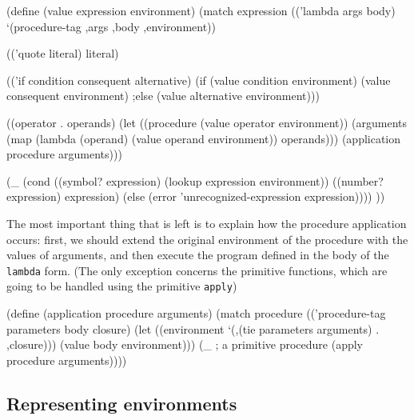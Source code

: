 \begin{Snippet}
(define (value expression environment)
  (match expression
    (('lambda args body)
     `(procedure-tag ,args ,body ,environment))
\end{Snippet}
\begin{Snippet}    
    (('quote literal)
     literal)
\end{Snippet}
\begin{Snippet}        
    (('if condition consequent alternative)
     (if (value condition environment)
         (value consequent environment)
     ;else
         (value alternative environment)))
\end{Snippet}
\begin{Snippet}    
    ((operator . operands)
     (let ((procedure (value operator environment))
           (arguments (map (lambda (operand)
                              (value operand environment))
			   operands)))
         (application procedure arguments)))
\end{Snippet}
\begin{Snippet}    
    (_
     (cond ((symbol? expression)
            (lookup expression environment))
           ((number? expression)
            expression)
           (else
            (error 'unrecognized-expression expression))))
    ))
\end{Snippet}

The most important thing that is left is to explain how
the procedure application occurs: first, we should extend
the original environment of the procedure with the values
of arguments, and then execute the program defined in
the body of the \texttt{lambda} form. (The only
exception concerns the primitive functions, which are
going to be handled using the primitive \texttt{apply})

\begin{Snippet}
(define (application procedure arguments)
  (match procedure
    (('procedure-tag parameters body closure)
     (let ((environment `(,(tie parameters arguments) . ,closure)))
       (value body environment)))
    (_ ; a primitive procedure
     (apply procedure arguments))))
\end{Snippet}

\subsection{Representing environments}

